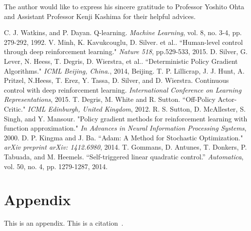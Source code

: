 \documentclass[english, dvipdfmx]{ampmt}             %
\begin{document}
\acknowledgment
The author would like to express his sincere gratitude to Professor
Yoshito Ohta and Assistant Professor Kenji Kashima for their helpful advices.

\begin{thebibliography}{10}
C. J. Watkins, and P. Dayan. Q-learning. \textit{Machine Learning}, vol. 8, no. 3-4, pp. 279-292, 1992.
V. Minh, K. Kavukcouglu, D. Silver. et al.. “Human-level control through deep reinforcement learning." \textit{Nature 518}, pp.529-533, 2015.
D. Silver, G. Lever, N. Heess, T. Degris, D. Wierstra, et al.. “Deterministic Policy Gradient Algorithms." \textit{ICML Beijing, China.}, 2014, Beijing.
T. P. Lillicrap, J. J. Hunt, A. Pritzel, N.Heess, T. Erez, Y. Tassa, D. Silver, and D. Wierstra. Continuous control with deep reinforcement learning. \textit{International Conference on Learning Representations}, 2015.
T. Degris, M. White and R. Sutton. “Off-Policy Actor-Critic." \textit{ICML Edinburgh, United Kingdom}, 2012.
R. S. Sutton, D. McAllester, S. Singh, and Y. Mansour. "Policy gradient methods for reinforcement learning with function approximation." \textit{In Advances in Neural Information Processing Systems}, 2000.
D. P. Kingma and J. Ba. “Adam: A Method for Stochastic Optimization." \textit{arXiv preprint arXiv: 1412.6980}, 2014.
T. Gommans, D. Antunes, T. Donkers, P. Tabuada, and M. Heemels. “Self-triggered linear quadratic control.” \textit{Automatica}, vol. 50, no. 4, pp. 1279-1287, 2014.

\end{thebibliography}

\appendix

\section{Appendix}
This is an appendix. This is a citation~\cite{polya1945}.
\end{document}
